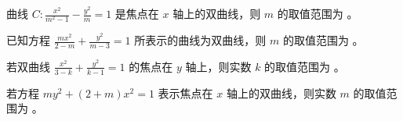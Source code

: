 \vspace{10em}

\begin{example}
    曲线 $C: \frac{x^2}{m^2-1}-\frac{y^2}{m}=1$ 是焦点在 $x$ 轴上的双曲线，则 $m$ 的取值范围为 \underline{\hspace{3cm}}。
\end{example}

\vspace{10em}

\begin{example}
    已知方程 $\frac{m x^2}{2-m}+\frac{y^2}{m-3}=1$ 所表示的曲线为双曲线，则 $m$ 的取值范围为 \underline{\hspace{3cm}}。
\end{example}

\vspace{10em}

\begin{example}
    若双曲线 $\frac{x^2}{3-k}+\frac{y^2}{k-1}=1$ 的焦点在 $y$ 轴上，则实数 $k$ 的取值范围为 \underline{\hspace{3cm}}。
\end{example}

\vspace{10em}

\begin{example}
    若方程 $m y^2+(2+m) x^2=1$ 表示焦点在 $x$ 轴上的双曲线，则实数 $m$ 的取值范围为 \underline{\hspace{3cm}}。
\end{example}

\vspace{10em}


